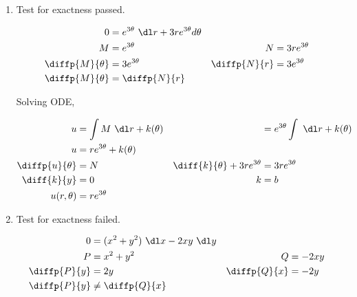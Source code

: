 \begin{enumerate}
    \item Test for exactness passed.

          \begin{align}
              0                 & = e^{3\theta}\ \dl r + 3r e^{3\theta} d\theta   \\
              M                 & = e^{3\theta}                                 &
              N                 & = 3re^{3\theta}                                 \\
              \diffp{M}{\theta} & = 3e^{3\theta}                                &
              \diffp{N}{r}      & = 3e^{3\theta}                                  \\
              \diffp{M}{\theta} & = \diffp{N}{r}
          \end{align}

          Solving ODE,

          \begin{align}
              u                                 & = \int M\ \dl r + k(\theta) &
                                                & = e^{3\theta} \int\ \dl r
              + k(\theta)                                                       \\
              u                                 & = re^{3\theta} + k(\theta)    \\
              \diffp{u}{\theta}                 & = N                         &
              \diff {k}{\theta} + 3re^{3\theta} & = 3re^{3\theta}               \\
              \diff{k}{y}                       & = 0                         &
              k                                 & = b                           \\
              u(r, \theta)                      & = re^{3\theta}
          \end{align}


    \item Test for exactness failed.

          \begin{align}
              0            & = (x^{2} + y^{2}) \ \dl x - 2xy \ \dl y   \\
              P            & = x^{2} + y^{2}                         &
              Q            & = -2xy                                    \\
              \diffp{P}{y} & = 2y                                    &
              \diffp{Q}{x} & = -2y                                     \\
              \diffp{P}{y} & \neq \diffp{Q}{x}
          \end{align}


\end{enumerate}
